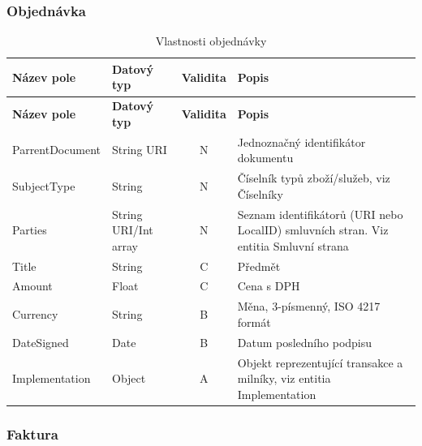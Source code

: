 \subsubsection*{Objednávka}

\begin{center}
\begin{longtable}{lp{20mm}cp{65mm}}
\label{grid_mlmmh} \\
\multicolumn{1}{l}{\textbf{Název pole}} & 
\multicolumn{1}{l}{\textbf{Datový typ}} & 
\multicolumn{1}{l}{\textbf{Validita}} & 
\multicolumn{1}{l}{\textbf{Popis}} \\ \hline 
\endfirsthead
\multicolumn{1}{l}{\textbf{Název pole}} & 
\multicolumn{1}{l}{\textbf{Datový typ}} & 
\multicolumn{1}{l}{\textbf{Validita}} & 
\multicolumn{1}{l}{\textbf{Popis}} \\ \hline 
\hline
\endhead
\endfoot
\caption{Vlastnosti objednávky}
\endlastfoot
ParrentDocument & String URI & N & Jednoznačný identifikátor dokumentu \\
SubjectType & String & N & Číselník typů zboží/služeb, viz Číselníky \\
Parties & String URI/Int array & N & Seznam identifikátorů (URI nebo LocalID) smluvních stran. Viz entitia Smluvní strana \\
\rowcolor{validateC}Title & String & C & Předmět \\
\rowcolor{validateC}Amount & Float & C & Cena s DPH \\
\rowcolor{validateB}Currency & String & B & Měna, 3-písmenný, ISO 4217 formát \\
\rowcolor{validateB}DateSigned & Date & B & Datum posledního podpisu \\
\rowcolor{validateA}Implementation & Object & A & Objekt reprezentující transakce a milníky, viz entitia Implementation \\
\end{longtable}
\end{center}

\subsubsection*{Faktura}

